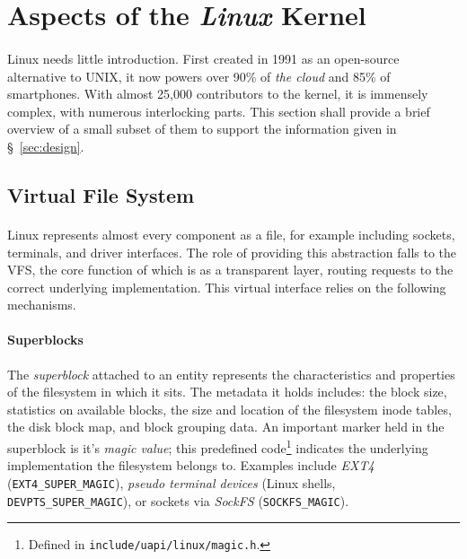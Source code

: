 
\section{Aspects of the \textit{Linux} Kernel}

\paragraph{} Linux needs little introduction. First created in 1991 as an open-source alternative to UNIX, it now powers over 90\% of \textit{the cloud} and 85\% of smartphones. With almost 25,000 contributors to the kernel, it is immensely complex, with numerous interlocking parts. This section shall provide a brief overview of a small subset of them to support the information given in §~\ref{sec:design}.

\subsection{Virtual File System}

\paragraph{} Linux represents almost every component as a file, for example including sockets, terminals, and driver interfaces. The role of providing this abstraction falls to the VFS, the core function of which is as a transparent layer, routing requests to the correct underlying implementation. This virtual interface relies on the following mechanisms.

\paragraph{Superblocks} The \textit{superblock} attached to an entity represents the characteristics and properties of the filesystem in which it sits. The metadata it holds includes: the block size, statistics on available blocks, the size and location of the filesystem inode tables, the disk block map, and block grouping data. An important marker held in the superblock is it's \textit{magic value}; this predefined code\footnote{Defined in \texttt{include/uapi/linux/magic.h}.} indicates the underlying implementation the filesystem belongs to. Examples include \textit{EXT4} (\texttt{EXT4\_SUPER\_MAGIC}), \textit{pseudo terminal devices} (Linux shells, \texttt{DEVPTS\_SUPER\_MAGIC}), or sockets via \textit{SockFS} (\texttt{SOCKFS\_MAGIC}).

